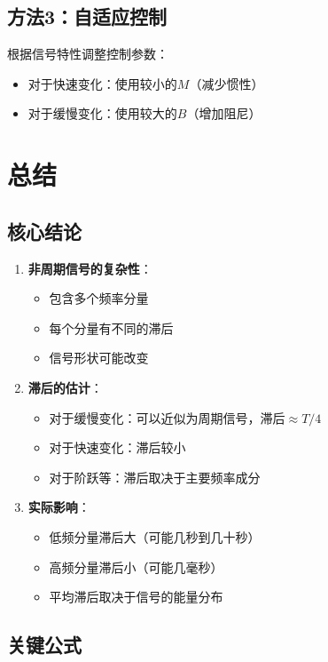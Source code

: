 \documentclass[12pt,a4paper]{article}
\begin{document}
\subsection{方法3：自适应控制}

根据信号特性调整控制参数：
\begin{itemize}
\item 对于快速变化：使用较小的$M$（减少惯性）
\item 对于缓慢变化：使用较大的$B$（增加阻尼）
\end{itemize}

\section{总结}

\subsection{核心结论}

\begin{enumerate}
\item \textbf{非周期信号的复杂性}：
\begin{itemize}
\item 包含多个频率分量
\item 每个分量有不同的滞后
\item 信号形状可能改变
\end{itemize}

\item \textbf{滞后的估计}：
\begin{itemize}
\item 对于缓慢变化：可以近似为周期信号，滞后$\approx T/4$
\item 对于快速变化：滞后较小
\item 对于阶跃等：滞后取决于主要频率成分
\end{itemize}

\item \textbf{实际影响}：
\begin{itemize}
\item 低频分量滞后大（可能几秒到几十秒）
\item 高频分量滞后小（可能几毫秒）
\item 平均滞后取决于信号的能量分布
\end{itemize}
\end{enumerate}

\subsection{关键公式}
\end{document}
